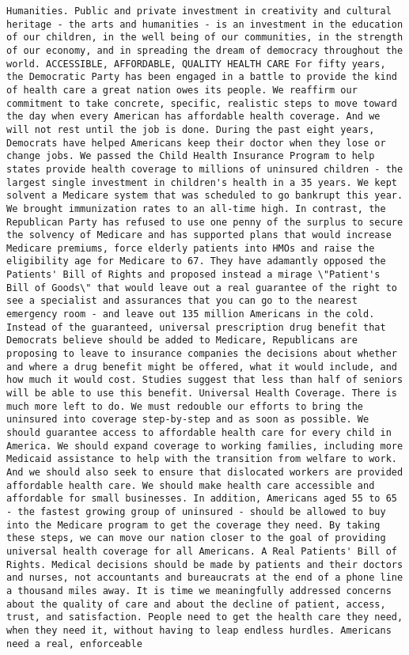 \documentclass[
]{article}
\begin{document}
\begin{verbatim}
Humanities. Public and private investment in creativity and cultural heritage - the arts and humanities - is an investment in the education of our children, in the well being of our communities, in the strength of our economy, and in spreading the dream of democracy throughout the world. ACCESSIBLE, AFFORDABLE, QUALITY HEALTH CARE For fifty years, the Democratic Party has been engaged in a battle to provide the kind of health care a great nation owes its people. We reaffirm our commitment to take concrete, specific, realistic steps to move toward the day when every American has affordable health coverage. And we will not rest until the job is done. During the past eight years, Democrats have helped Americans keep their doctor when they lose or change jobs. We passed the Child Health Insurance Program to help states provide health coverage to millions of uninsured children - the largest single investment in children's health in a 35 years. We kept solvent a Medicare system that was scheduled to go bankrupt this year. We brought immunization rates to an all-time high. In contrast, the Republican Party has refused to use one penny of the surplus to secure the solvency of Medicare and has supported plans that would increase Medicare premiums, force elderly patients into HMOs and raise the eligibility age for Medicare to 67. They have adamantly opposed the Patients' Bill of Rights and proposed instead a mirage \"Patient's Bill of Goods\" that would leave out a real guarantee of the right to see a specialist and assurances that you can go to the nearest emergency room - and leave out 135 million Americans in the cold. Instead of the guaranteed, universal prescription drug benefit that Democrats believe should be added to Medicare, Republicans are proposing to leave to insurance companies the decisions about whether and where a drug benefit might be offered, what it would include, and how much it would cost. Studies suggest that less than half of seniors will be able to use this benefit. Universal Health Coverage. There is much more left to do. We must redouble our efforts to bring the uninsured into coverage step-by-step and as soon as possible. We should guarantee access to affordable health care for every child in America. We should expand coverage to working families, including more Medicaid assistance to help with the transition from welfare to work. And we should also seek to ensure that dislocated workers are provided affordable health care. We should make health care accessible and affordable for small businesses. In addition, Americans aged 55 to 65 - the fastest growing group of uninsured - should be allowed to buy into the Medicare program to get the coverage they need. By taking these steps, we can move our nation closer to the goal of providing universal health coverage for all Americans. A Real Patients' Bill of Rights. Medical decisions should be made by patients and their doctors and nurses, not accountants and bureaucrats at the end of a phone line a thousand miles away. It is time we meaningfully addressed concerns about the quality of care and about the decline of patient, access, trust, and satisfaction. People need to get the health care they need, when they need it, without having to leap endless hurdles. Americans need a real, enforceable 
\end{verbatim}
\end{document}
